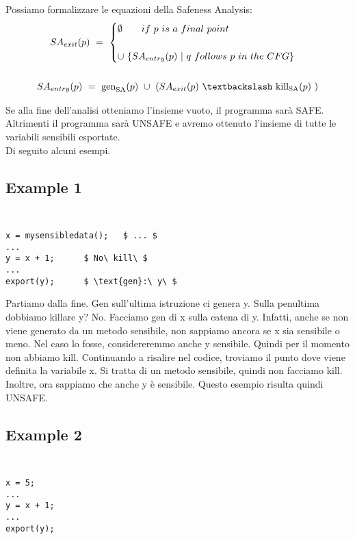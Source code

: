 \documentclass[letterpaper,twocolumn,10pt]{article}
\begin{document}
Possiamo formalizzare le equazioni della Safeness Analysis:
\begin{gather*}
SA_\textrm{$exit$}(p)\ =\ 
\begin{cases}
\emptyset\qquad if\ p\ is\ a\ final\ point\ \\ \\
\cup\ \lbrace SA_\textrm{$entry$}(p)\ |\ q\ follows\ p\ in\ the\ CFG \rbrace 
\end{cases} \\ \\
SA_\textrm{$entry$}(p)\ =\ \text{gen}_\textrm{SA}(p)\ \cup\ (SA_\textrm{$exit$}(p)\ \textbackslash\ \text{kill}_\textrm{SA}(p)\ )
\end{gather*}

Se alla fine dell'analisi otteniamo l'insieme vuoto, il programma sar\`a SAFE. Altrimenti il programma sar\`a UNSAFE e avremo ottenuto l'insieme di tutte le variabili sensibili esportate.\\
Di seguito alcuni esempi.\\

\subsection{Example 1}
{\tt \small
\begin{verbatim}
x = mysensibledata();	$ ... $		
...
y = x + 1;		$ No\ kill\ $
...	
export(y);		$ \text{gen}:\ y\ $
\end{verbatim}
}

Partiamo dalla fine. Gen sull'ultima istruzione ci genera y. Sulla penultima dobbiamo killare y? No. Facciamo gen di x sulla catena di y. Infatti, anche se non viene generato da un metodo sensibile, non sappiamo ancora se x sia sensibile o meno. Nel caso lo fosse, considereremmo anche y sensibile. Quindi per il momento non abbiamo kill. Continuando a risalire nel codice, troviamo il punto dove viene definita la variabile x. Si tratta di un metodo sensibile, quindi non facciamo kill. Inoltre, ora sappiamo che anche y \`e sensibile. Questo esempio risulta quindi UNSAFE.\\

\subsection{Example 2}
{\tt \small
\begin{verbatim}
x = 5;			
...
y = x + 1;	
...	
export(y);		
\end{verbatim}
}
\end{document}
